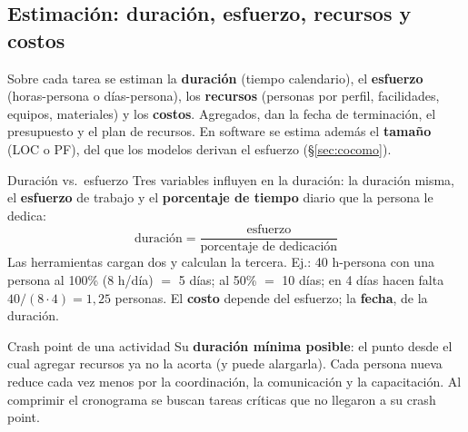 \documentclass[11pt,a4paper]{article}
\begin{document}
\subsection{Estimación: duración, esfuerzo, recursos y costos}
\label{sec:estim}
Sobre cada tarea se estiman la \textbf{duración} (tiempo calendario), el \textbf{esfuerzo} (horas-persona o
días-persona), los \textbf{recursos} (personas por perfil, facilidades, equipos, materiales) y los
\textbf{costos}. Agregados, dan la fecha de terminación, el presupuesto y el plan de recursos. En software se
estima además el \textbf{tamaño} (LOC o PF), del que los modelos derivan el esfuerzo (§\ref{sec:cocomo}).
\begin{defbox}{Duración vs.\ esfuerzo}
Tres variables influyen en la duración: la duración misma, el \textbf{esfuerzo} de trabajo y el
\textbf{porcentaje de tiempo} diario que la persona le dedica:
\[ \text{duración} = \frac{\text{esfuerzo}}{\text{porcentaje de dedicación}} \]
Las herramientas cargan dos y calculan la tercera. Ej.: 40 h-persona con una persona al 100\% (8 h/día) $=$
5 días; al 50\% $=$ 10 días; en 4 días hacen falta $40/(8\cdot 4) = 1{,}25$ personas. El \textbf{costo}
depende del esfuerzo; la \textbf{fecha}, de la duración.
\end{defbox}
\begin{defbox}{Crash point de una actividad}
Su \textbf{duración mínima posible}: el punto desde el cual agregar recursos ya no la acorta (y puede
alargarla). Cada persona nueva reduce cada vez menos por la coordinación, la comunicación y la capacitación.
Al comprimir el cronograma se buscan tareas críticas que no llegaron a su crash point.
\end{defbox}
\end{document}
